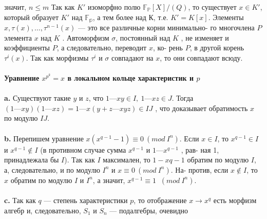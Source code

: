 \documentclass{mai_book}
\begin{document}
\pagebreak
\noindent значит, $n \leqslant m$ Так как $K'$ изоморфно полю $\mathbb{F_P}[X]/(Q)$, то существует\linebreak
$x \in K'$, который образует $K'$ над $\mathbb{F_p}$, а тем более над К, т.е. $K' = K[x].$\linebreak
Элементы $x, \tau(x),\ldots,\tau^{n-1}(x)$ --- это все различные корни минимально-\linebreak
го многочлена $P$ элемента $x$ над $K$ . Автоморфизм $\sigma$, постоянный над
$K$ , не изменяет и коэффициенты $P$, а следовательно, переводит $x$, ко-\linebreak
рень $P$, в другой корень $\tau^{i}(x)$. Так как морфизмы $\tau^{i}$ и $\sigma$ совпадают на\linebreak
$x$, то они совпадают всюду.\\
\\
\noindent\textbf{Уравнение $x^{p^{k}} = x$ в локальном кольце характеристик и $p$}\\
\\
\hspace*{15pt}\textbf{a.} Существуют такие $y$ и $z$, что $1 — xy \in I,~ 1 — xz \in J.$ Тогда\linebreak
$(1 — xy)(1 — xz) = 1 — x(y + z — xyz) \in IJ$ , что доказывает обратимость
$x$ по модулю $I J$.\\
\\
\hspace*{15pt}\textbf{b.} Перепишем уравнение $x(x^{q-1} - 1) \equiv 0 ~(mod~ I^{n})$. Если $x \in I$, то\linebreak
$x^{q-1} \in I$ и $x^{q-1} \notin I$ (в противном случае сумма $x^{q-1}$ и $1 — x^{q-1}$ , рав-\linebreak
ная 1, принадлежала бы $I$). Так как $I$ максимален, то $1 - x{q-1}$ обратим
по модулю $I$, а, следовательно, и по модулю $I^{n}$ и $x \equiv 0 ~(mod~ I^{n})$. На-\linebreak
против, если $x \notin I$, то $x$ обратим по модулю $I$ и $I^{n}$, а значит, $x^{q-1} \equiv 1$\linebreak
$~(mod~ I^{n})$.\\
\\
\hspace*{15pt}\textbf{c.} Так как $q$ --- степень характеристики $p$, то отображение $x \rightarrow x^{q}$
есть морфизм алгебр и, следовательно, $S_1$ и $S_n$ --- подалгебры, очевидно
\end{document}
